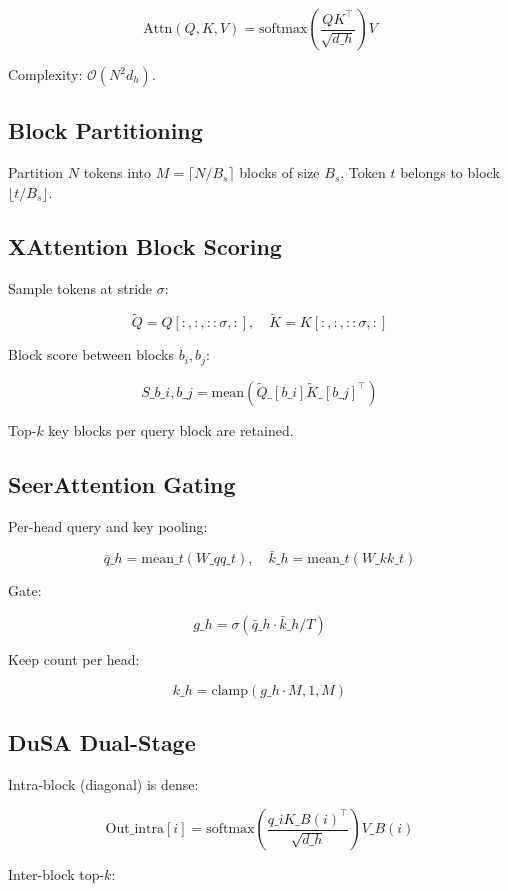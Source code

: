 \[
\text{Attn}(Q, K, V) = \text{softmax}\!\left(\frac{Q K^\top}{\sqrt{d\_h}}\right) V
\tag{3.1}
\]

Complexity: $\mathcal{O}(N^2 d_h)$.

\subsection{Block Partitioning}

Partition $N$ tokens into $M = \lceil N / B_s \rceil$ blocks of size $B_s$. 
Token $t$ belongs to block $\lfloor t / B_s \rfloor$.

\subsection{XAttention Block Scoring}

Sample tokens at stride $\sigma$:

\[
\tilde{Q} = Q[:, :, ::\sigma, :], \quad \tilde{K} = K[:, :, ::\sigma, :]
\tag{3.2}
\]

Block score between blocks $b_i, b_j$:

\[
S\_{b\_i, b\_j} = \text{mean}(\tilde{Q}\_{[b\_i]} \tilde{K}\_{[b\_j]}^\top)
\tag{3.3}
\]

Top-$k$ key blocks per query block are retained.

\subsection{SeerAttention Gating}

Per-head query and key pooling:

\[
\bar{q}\_h = \text{mean}\_t(W\_q q\_t), \quad \bar{k}\_h = \text{mean}\_t(W\_k k\_t)
\tag{3.4}
\]

Gate:

\[
g\_h = \sigma(\bar{q}\_h \cdot \bar{k}\_h / T)
\tag{3.5}
\]

Keep count per head:

\[
k\_h = \text{clamp}(g\_h \cdot M, 1, M)
\tag{3.6}
\]

\subsection{DuSA Dual-Stage}

Intra-block (diagonal) is dense:

\[
\text{Out}\_\text{intra}[i] = \text{softmax}\!\left(\frac{q\_i K\_{B(i)}^\top}{\sqrt{d\_h}}\right) V\_{B(i)}
\tag{3.7}
\]

Inter-block top-$k$:

